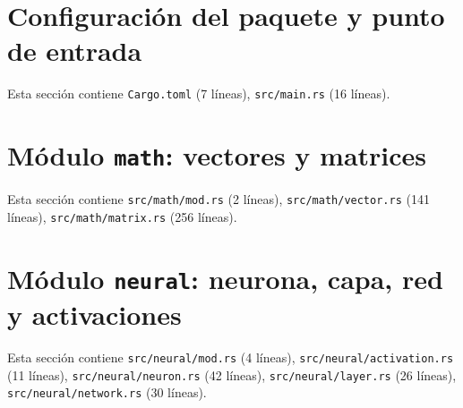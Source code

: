 \section{Configuración del paquete y punto de entrada}
Esta sección contiene \texttt{Cargo.toml} (7 líneas), \texttt{src/main.rs} (16 líneas).
\section{Módulo \texttt{math}: vectores y matrices}
Esta sección contiene \texttt{src/math/mod.rs} (2 líneas), \texttt{src/math/vector.rs} (141 líneas), \texttt{src/math/matrix.rs} (256 líneas).
\section{Módulo \texttt{neural}: neurona, capa, red y activaciones}
Esta sección contiene \texttt{src/neural/mod.rs} (4 líneas), \texttt{src/neural/activation.rs} (11 líneas), \texttt{src/neural/neuron.rs} (42 líneas), \texttt{src/neural/layer.rs} (26 líneas), \texttt{src/neural/network.rs} (30 líneas).
